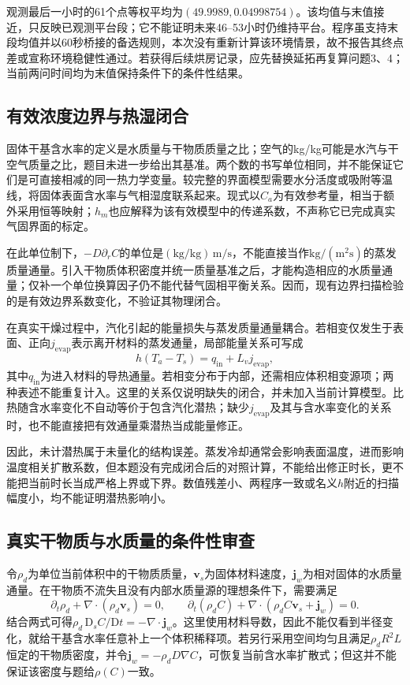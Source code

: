 \documentclass[UTF8,12pt,a4paper]{ctexart}
\begin{document}
观测最后一小时的61个点等权平均为$(49.9989,0.04998754)$。该均值与末值接近，只反映已观测平台段；它不能证明未来46--53小时仍维持平台。程序虽支持末段均值并以60秒桥接的备选规则，本次没有重新计算该环境情景，故不报告其终点差或宣称环境稳健性通过。若获得后续烘房记录，应先替换延拓再复算问题3、4；当前两问时间均为末值保持条件下的条件性结果。

\subsection{有效浓度边界与热湿闭合}
固体干基含水率的定义是水质量与干物质质量之比；空气的kg/kg可能是水汽与干空气质量之比，题目未进一步给出其基准。两个数的书写单位相同，并不能保证它们是可直接相减的同一热力学变量。较完整的界面模型需要水分活度或吸附等温线，将固体表面含水率与气相湿度联系起来\cite{comsol_sorption,comsol_air}。现式以$C_a$为有效参考量，相当于额外采用恒等映射；$h_m$也应解释为该有效模型中的传递系数，不声称它已完成真实气固界面的标定。

在此单位制下，$-D\partial_r C$的单位是$(\mathrm{kg/kg})\,\mathrm{m/s}$，不能直接当作$\mathrm{kg/(m^2s)}$的蒸发质量通量。引入干物质体积密度并统一质量基准之后，才能构造相应的水质量通量；仅补一个单位换算因子仍不能代替气固相平衡关系。因而，现有边界扫描检验的是有效边界系数变化，不验证其物理闭合。

在真实干燥过程中，汽化引起的能量损失与蒸发质量通量耦合。若相变仅发生于表面、正向$j_{\mathrm{evap}}$表示离开材料的蒸发通量，局部能量关系可写成
\begin{equation}
h(T_a-T_s)=q_{\mathrm{in}}+L_vj_{\mathrm{evap}},
\end{equation}
其中$q_{\mathrm{in}}$为进入材料的导热通量。若相变分布于内部，还需相应体积相变源项；两种表述不能重复计入\cite{comsol_latent}。这里的关系仅说明缺失的闭合，并未加入当前计算模型。比热随含水率变化不自动等价于包含汽化潜热；缺少$j_{\mathrm{evap}}$及其与含水率变化的关系时，也不能直接把有效通量乘潜热当成能量修正。

因此，未计潜热属于未量化的结构误差。蒸发冷却通常会影响表面温度，进而影响温度相关扩散系数，但本题没有完成闭合后的对照计算，不能给出修正时长，更不能把当前时长当成严格上界或下界。数值残差小、两程序一致或名义$h$附近的扫描幅度小，均不能证明潜热影响小。

\subsection{真实干物质与水质量的条件性审查}
令$\rho_d$为单位当前体积中的干物质质量，$\boldsymbol v_s$为固体材料速度，$\boldsymbol j_w$为相对固体的水质量通量。在干物质不流失且没有内部水质量源的理想条件下，需要满足
\begin{equation}
\partial_t\rho_d+\nabla\!\cdot(\rho_d\boldsymbol v_s)=0,\qquad
\partial_t(\rho_d C)+\nabla\!\cdot(\rho_d C\boldsymbol v_s+\boldsymbol j_w)=0.
\end{equation}
结合两式可得$\rho_d\,\mathrm D_sC/\mathrm Dt=-\nabla\!\cdot\boldsymbol j_w$。这里使用材料导数，因此不能仅看到半径变化，就给干基含水率任意补上一个体积稀释项。若另行采用空间均匀且满足$\rho_dR^2L$恒定的干物质密度，并令$\boldsymbol j_w=-\rho_dD\nabla C$，可恢复当前含水率扩散式；但这并不能保证该密度与题给$\rho(C)$一致。
\end{document}
